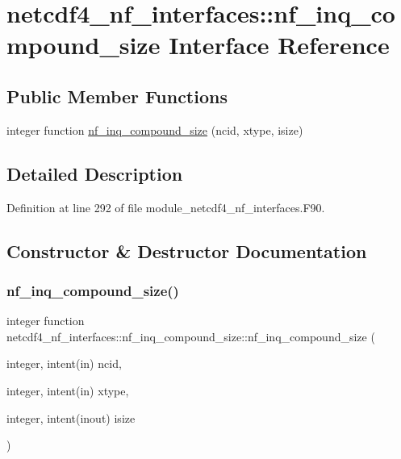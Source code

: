 \hypertarget{interfacenetcdf4__nf__interfaces_1_1nf__inq__compound__size}{}\section{netcdf4\+\_\+nf\+\_\+interfaces\+:\+:nf\+\_\+inq\+\_\+compound\+\_\+size Interface Reference}
\label{interfacenetcdf4__nf__interfaces_1_1nf__inq__compound__size}
\subsection*{Public Member Functions}
\begin{DoxyCompactItemize}
\item 
integer function \hyperlink{interfacenetcdf4__nf__interfaces_1_1nf__inq__compound__size_a451128bb98adcdfe001cecd805424488}{nf\+\_\+inq\+\_\+compound\+\_\+size} (ncid, xtype, isize)
\end{DoxyCompactItemize}


\subsection{Detailed Description}


Definition at line 292 of file module\+\_\+netcdf4\+\_\+nf\+\_\+interfaces.\+F90.



\subsection{Constructor \& Destructor Documentation}
\mbox{\label{interfacenetcdf4__nf__interfaces_1_1nf__inq__compound__size_a451128bb98adcdfe001cecd805424488}} 
\subsubsection{\texorpdfstring{nf\+\_\+inq\+\_\+compound\+\_\+size()}{nf\_inq\_compound\_size()}}
{\footnotesize\ttfamily integer function netcdf4\+\_\+nf\+\_\+interfaces\+::nf\+\_\+inq\+\_\+compound\+\_\+size\+::nf\+\_\+inq\+\_\+compound\+\_\+size (\begin{DoxyParamCaption}\item[{integer, intent(in)}]{ncid,  }\item[{integer, intent(in)}]{xtype,  }\item[{integer, intent(inout)}]{isize }\end{DoxyParamCaption})}



